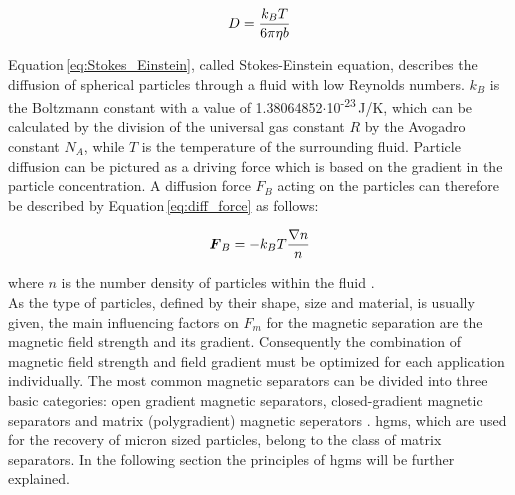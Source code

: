 \begin{equation}
\label{eq:Stokes_Einstein}
\centering
D = \frac{k_{B}T}{6\pi\eta b}
\end{equation}

Equation\,\ref{eq:Stokes_Einstein}, called Stokes-Einstein equation, describes the diffusion of spherical particles through a fluid with low Reynolds numbers. $k_{B}$ is the Boltzmann constant with a value of 1.38064852$\cdotp$10\textsuperscript{-23}\,J/K, which can be calculated by the division of the universal gas constant $R$ by the Avogadro constant $N_{A}$, while $T$ is the temperature of the surrounding fluid. Particle diffusion can be pictured as a driving force which is based on the gradient in the particle concentration. 
A diffusion force $F_{B}$ acting on the particles can therefore be described by Equation\,\ref{eq:diff_force} as follows:

\begin{equation}
\label{eq:diff_force}
\centering
\boldsymbol{F}_{B} = -k_{B}T\frac{\nabla n}{n}
\end{equation}

where $n$ is the number density of particles within the fluid \cite{choomphon2017simulation,moeser2004high,fletcher1991fine}. \\ \newline
As the type of particles, defined by their shape, size and material, is usually given, the main influencing factors on $F_{m}$ for the magnetic separation are the magnetic field strength and its gradient. Consequently the combination of magnetic field strength and field gradient must be optimized for each application individually. The most common magnetic separators can be divided into three basic categories: open gradient magnetic separators, closed-gradient magnetic separators and matrix (polygradient) magnetic seperators \cite{svoboda2004magnetic}. \Gls{hgms}, which are used for the recovery of micron sized particles, belong to the class of matrix separators. In the following section the principles of \gls{hgms} will be further explained.  


